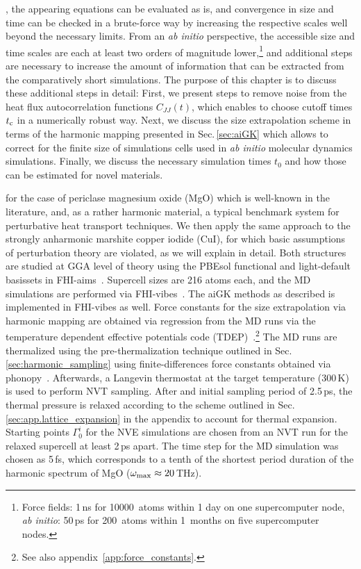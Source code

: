 , the appearing equations can be evaluated as is, and convergence in size and time can be checked in a brute-force way by increasing the respective scales well beyond the necessary limits.
From an \emph{ab initio} perspective, the accessible size and time scales are each at least two orders of magnitude lower,\footnote{Force fields: 1\,ns for 10000~atoms within 1 day on one supercomputer node, \emph{ab initio}: 50\,ps for 200~atoms within 1~months on five supercomputer nodes.} and additional steps are necessary to increase the amount of information that can be extracted from the comparatively short simulations. The purpose of this chapter is to discuss these additional steps in detail: First, we present steps to remove noise from the heat flux autocorrelation functions $C_{JJ} (t)$, which enables to choose cutoff times $t_{\rm c}$ in a numerically robust way. Next, we discuss the size extrapolation scheme in terms of the harmonic mapping presented in Sec.\,\ref{sec:aiGK} which allows to correct for the finite size of simulations cells used in \emph{ab initio} molecular dynamics simulations. Finally, we discuss the necessary simulation times $t_0$ and how those can be estimated for novel materials.

 for the case of periclase magnesium oxide (MgO) which is well-known in the literature, and, as a rather harmonic material, a typical benchmark system for perturbative heat transport techniques. We then apply the same approach to the strongly anharmonic marshite copper iodide (CuI), for which basic assumptions of perturbation theory are violated, as we will explain in detail. 
Both structures are studied at GGA level of theory using the PBEsol functional and light-default basissets in FHI-aims~\cite{Perdew.2008,FHI-aims}. Supercell sizes are 216 atoms each, and the MD simulations are performed via FHI-vibes~\cite{Larsen.2017,FHI-vibes}. The aiGK methods as described is implemented in FHI-vibes as well. Force constants for the size extrapolation via harmonic mapping are obtained via regression from the MD runs via the temperature dependent effective potentials code (TDEP)~\cite{Hellman.2013}.\footnote{See also appendix~\ref{app:force_constants}.} The MD runs are thermalized using the pre-thermalization technique outlined in Sec.\,\ref{sec:harmonic_sampling} using finite-differences force constants obtained via phonopy~\cite{phonopy}. Afterwards, a Langevin thermostat at the target temperature (300\,K) is used to perform NVT sampling. After and initial sampling period of 2.5\,ps, the thermal pressure is relaxed according to the scheme outlined in Sec.\,\ref{sec:app.lattice_expansion} in the appendix to account for thermal expansion. Starting points $\Gamma^i_0$ for the NVE simulations are chosen from an NVT run for the relaxed supercell at least 2\,ps apart. The time step for the MD simulation was chosen as 5\,fs, which corresponds to a tenth of the shortest period duration of the harmonic spectrum of MgO ($\omega_{\rm max} \approx 20$\,THz).


